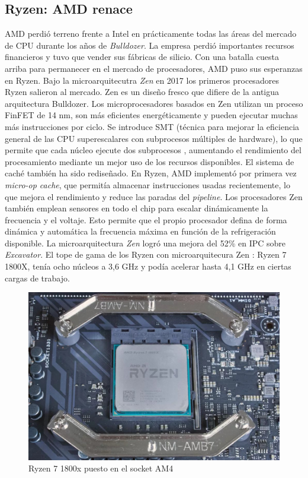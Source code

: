 \subsection{Ryzen: AMD renace}
AMD perdió terreno frente a Intel en prácticamente todas las áreas del mercado de CPU durante los años de \emph{Bulldozer}. 
La empresa perdió importantes recursos financieros y tuvo que vender sus fábricas de silicio. Con una batalla cuesta arriba para 
permanecer en el mercado de procesadores, AMD puso sus esperanzas en Ryzen.
Bajo la microarquitecutra \emph{Zen}  en 2017 los primeros procesadores Ryzen salieron al mercado. 
Zen es un diseño fresco que difiere de la antigua arquitectura Bulldozer. Los microprocesadores basados en Zen utilizan un proceso FinFET de 14 nm,  
son más eficientes energéticamente y pueden ejecutar muchas más instrucciones por ciclo. Se introduce SMT
(técnica para mejorar la eficiencia general de las CPU superescalares con subprocesos múltiples de hardware), lo que permite que cada núcleo ejecute dos subprocesos
, aumentando el rendimiento del procesamiento mediante un mejor uso de los recursos disponibles.
El sistema de caché también ha sido rediseñado. En Ryzen, AMD implementó por primera vez \emph{micro-op cache}, que permitía almacenar instrucciones usadas recientemente, 
lo que mejora el rendimiento y reduce las paradas del \emph{pipeline}.
Los procesadores Zen también emplean sensores en todo el chip para escalar dinámicamente la frecuencia y el voltaje. Esto permite que el propio procesador defina de forma 
dinámica y automática la frecuencia máxima en función de la refrigeración disponible.
La microarquitectura \emph{Zen} logró una mejora del 52\% en IPC sobre \emph{Excavator}. 
El tope de gama de los Ryzen con microarquitecura Zen : Ryzen 7 1800X, tenía ocho núcleos  a 3,6 GHz y podía acelerar hasta 4,1 GHz en ciertas cargas de trabajo.

\begin{figure}[htb]
	\centering
	\includegraphics[scale = 0.4]{Graphics/ryzen 7 1800x.jpg}
	\caption{Ryzen 7 1800x puesto en el  socket AM4}
	\label{fig:28}
\end{figure}

